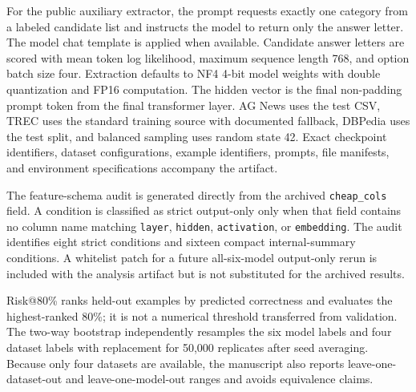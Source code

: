 \documentclass[preprint,12pt]{elsarticle}
\begin{document}
For the public auxiliary extractor, the prompt requests exactly one category from a labeled candidate list and instructs the model to return only the answer letter. The model chat template is applied when available. Candidate answer letters are scored with mean token log likelihood, maximum sequence length 768, and option batch size four. Extraction defaults to NF4 4-bit model weights with double quantization and FP16 computation. The hidden vector is the final non-padding prompt token from the final transformer layer. AG News uses the test CSV, TREC uses the standard training source with documented fallback, DBPedia uses the test split, and balanced sampling uses random state 42. Exact checkpoint identifiers, dataset configurations, example identifiers, prompts, file manifests, and environment specifications accompany the artifact.

The feature-schema audit is generated directly from the archived \texttt{cheap\_cols} field. A condition is classified as strict output-only only when that field contains no column name matching \texttt{layer}, \texttt{hidden}, \texttt{activation}, or \texttt{embedding}. The audit identifies eight strict conditions and sixteen compact internal-summary conditions. A whitelist patch for a future all-six-model output-only rerun is included with the analysis artifact but is not substituted for the archived results.

Risk@80\% ranks held-out examples by predicted correctness and evaluates the highest-ranked 80\%; it is not a numerical threshold transferred from validation. The two-way bootstrap independently resamples the six model labels and four dataset labels with replacement for 50,000 replicates after seed averaging. Because only four datasets are available, the manuscript also reports leave-one-dataset-out and leave-one-model-out ranges and avoids equivalence claims.
\end{document}
